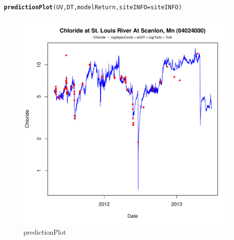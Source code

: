 \documentclass[a4paper,11pt]{article}\usepackage[]{graphicx}\usepackage[]{color}
\makeatletter
\def\maxwidth{ %
  \ifdim\Gin@nat@width>\linewidth
    \linewidth
  \else
    \Gin@nat@width
  \fi
}
\newcommand{\hlstd}[1]{\textcolor[rgb]{0.345,0.345,0.345}{#1}}%
\newcommand{\hlkwc}[1]{\textcolor[rgb]{0.333,0.667,0.333}{#1}}%
\newcommand{\hlkwd}[1]{\textcolor[rgb]{0.737,0.353,0.396}{\textbf{#1}}}%
\newenvironment{kframe}{%
 \def\at@end@of@kframe{}%
 \ifinner\ifhmode%
  \def\at@end@of@kframe{\end{minipage}}%
  \begin{minipage}{\columnwidth}%
 \fi\fi%
 \def\FrameCommand##1{\hskip\@totalleftmargin \hskip-\fboxsep
 \colorbox{shadecolor}{##1}\hskip-\fboxsep
     \hskip-\linewidth \hskip-\@totalleftmargin \hskip\columnwidth}%
 \MakeFramed {\advance\hsize-\width
   \@totalleftmargin\z@ \linewidth\hsize
   \@setminipage}}%
 {\par\unskip\endMakeFramed%
 \at@end@of@kframe}
\newenvironment{knitrout}{}{} %
\makeatother
\begin{document}
\begin{knitrout}
\color{fgcolor}\begin{kframe}
\begin{alltt}
\hlkwd{predictionPlot}\hlstd{(UV,DT,modelReturn,}\hlkwc{siteINFO}\hlstd{=siteINFO)}
\end{alltt}
\end{kframe}\begin{figure}[]

\includegraphics[width=\maxwidth]{figure/predictionPlot} \caption[predictionPlot]{predictionPlot\label{fig:predictionPlot}}
\end{figure}


\end{knitrout}


\FloatBarrier
\end{document}
